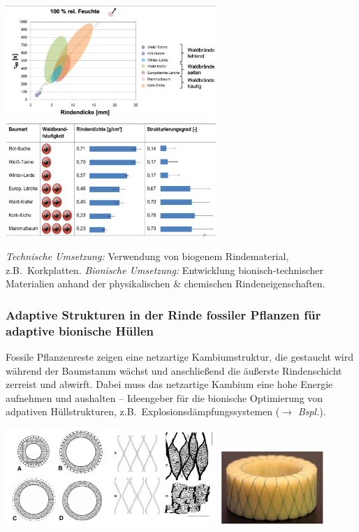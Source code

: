 \begin{center}
    \includegraphics[width=8cm]{lec6/figures/rindendicke.png}
    \hfill
    \includegraphics[width=8cm]{lec6/figures/rindendichte.png}
\end{center}
\textit{Technische Umsetzung:} Verwendung von biogenem Rindematerial, z.B.\ Korkplatten. \textit{Bionische Umsetzung:} Entwicklung bionisch-technischer Materialien anhand der physikalischen \& chemischen Rindeneigenschaften.

\subsubsection{Adaptive Strukturen in der Rinde fossiler Pflanzen für adaptive bionische Hüllen}

Fossile Pflanzenreste zeigen eine netzartige Kambiumstruktur, die gestaucht wird während der Baumstamm wächst und anschließend die äußerste Rindenschicht zerreist und abwirft. Dabei muss das netzartige Kambium eine hohe Energie aufnehmen und aushalten -- Ideengeber für die bionische Optimierung von adpativen Hüllstrukturen, z.B.\ Explosionsdämpfungssystemen (\dangersign $\rightarrow$ \textit{Bspl.}).

\begin{center}
    \includegraphics[width=8cm]{lec6/figures/rindennetz.png}
    \hfill
    \includegraphics[width=4cm]{lec6/figures/explosion.png}
\end{center}

